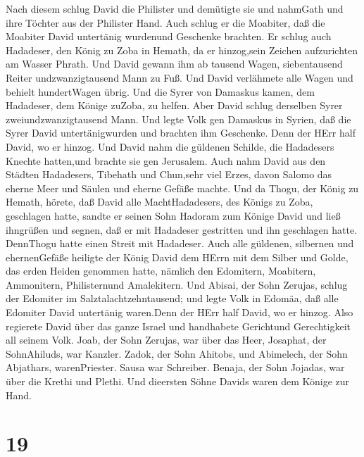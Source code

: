  Nach diesem schlug David die Philister und demütigte sie
und nahmGath und ihre Töchter aus der Philister Hand.  Auch
schlug er die Moabiter, daß die Moabiter David untertänig wurdenund
Geschenke brachten.  Er schlug auch Hadadeser, den König zu
Zoba in Hemath, da er hinzog,sein Zeichen aufzurichten am Wasser Phrath.
 Und David gewann ihm ab tausend Wagen, siebentausend Reiter
undzwanzigtausend Mann zu Fuß. Und David verlähmete alle Wagen und
behielt hundertWagen übrig.  Und die Syrer von Damaskus
kamen, dem Hadadeser, dem Könige zuZoba, zu helfen. Aber David schlug
derselben Syrer zweiundzwanzigtausend Mann.  Und legte Volk
gen Damaskus in Syrien, daß die Syrer David untertänigwurden und
brachten ihm Geschenke. Denn der HErr half David, wo er hinzog.
 Und David nahm die güldenen Schilde, die Hadadesers Knechte
hatten,und brachte sie gen Jerusalem.  Auch nahm David aus
den Städten Hadadesers, Tibehath und Chun,sehr viel Erzes, davon Salomo
das eherne Meer und Säulen und eherne Gefäße machte.  Und da
Thogu, der König zu Hemath, hörete, daß David alle MachtHadadesers, des
Königs zu Zoba, geschlagen hatte,  sandte er seinen Sohn
Hadoram zum Könige David und ließ ihngrüßen und segnen, daß er mit
Hadadeser gestritten und ihn geschlagen hatte. DennThogu hatte einen
Streit mit Hadadeser. Auch alle güldenen, silbernen und ehernenGefäße
 heiligte der König David dem HErrn mit dem Silber und
Golde, das erden Heiden genommen hatte, nämlich den Edomitern,
Moabitern, Ammonitern, Philisternund Amalekitern.  Und
Abisai, der Sohn Zerujas, schlug der Edomiter im Salztalachtzehntausend;
 und legte Volk in Edomäa, daß alle Edomiter David
untertänig waren.Denn der HErr half David, wo er hinzog. 
Also regierete David über das ganze Israel und handhabete Gerichtund
Gerechtigkeit all seinem Volk.  Joab, der Sohn Zerujas, war
über das Heer, Josaphat, der SohnAhiluds, war Kanzler. 
Zadok, der Sohn Ahitobs, und Abimelech, der Sohn Abjathars,
warenPriester. Sausa war Schreiber.  Benaja, der Sohn
Jojadas, war über die Krethi und Plethi. Und dieersten Söhne Davids
waren dem Könige zur Hand.

\hypertarget{section-18}{%
\section{19}\label{section-18}}

